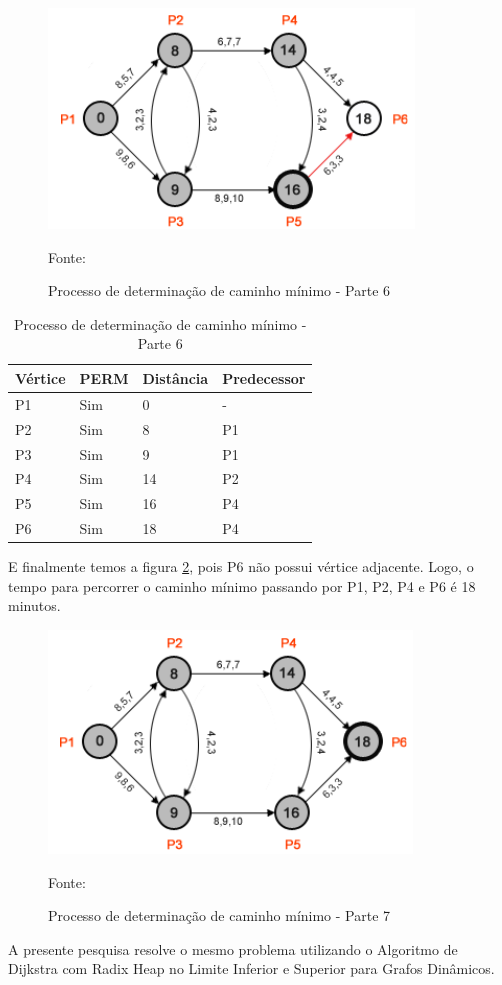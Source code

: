 \begin{figure}[htbp]
\centering
 \includegraphics[width=.50\textwidth]{chapters/fig/leo7.png}
\caption{Processo de determinação de caminho mínimo - Parte 6}
Fonte: \cite{leonard}
\label{fig:leo7}
\end{figure}
\FloatBarrier
\begin{table}[htbp]
	\centering
	\begin{tabular}{l l l l}
	\toprule
	Vértice & PERM & Distância & Predecessor\\
	\midrule
	P1 & Sim & 0 & - \\
	P2 & Sim & 8 & P1 \\
	P3 & Sim & 9 & P1 \\
	P4 & Sim & 14 & P2 \\
	P5 & Sim & 16 & P4 \\
	P6 & Sim & 18 & P4 \\
	\bottomrule
	\end{tabular}
\caption{Processo de determinação de caminho mínimo - Parte 6}
 \label{tab:leotab5}
\end{table}
\FloatBarrier

E finalmente temos a figura \ref{fig:leo8}, pois P6 não possui vértice adjacente. Logo, o 
tempo para percorrer o caminho mínimo passando por P1, P2, P4 e P6 é 18 minutos.

\begin{figure}[htbp]
\centering
 \includegraphics[width=.50\textwidth]{chapters/fig/leo8.png}
\caption{Processo de determinação de caminho mínimo - Parte 7}
Fonte: \cite{leonard}
\label{fig:leo8}
\end{figure}
\FloatBarrier

A presente pesquisa resolve o mesmo problema utilizando o Algoritmo de Dijkstra com Radix Heap no Limite Inferior e Superior
para Grafos Dinâmicos.

